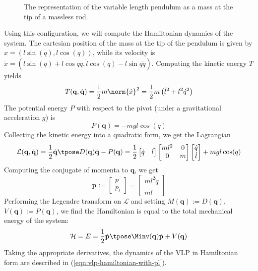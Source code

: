 \begin{figure}
   \centering
   
   \caption{The representation of the variable length pendulum as a mass at the
      tip of a massless rod.}\label{fig:vlp-model}
\end{figure}

Using this configuration, we will compute the Hamiltonian dynamics of the system.
The cartesian position of the mass at the tip of the pendulum
is given by \(x = (l\sin(q),l\cos(q))\), while its velocity is
\(\dot{x} = (\dot{l}\sin(q) + l\cos{q}\dot{q}, \dot{l}\cos(q) - l\sin{q}\dot{q})\).
Computing the kinetic energy \(T\) yields
\[
   T(\mathbf{q},\dot{\mathbf{q}}) = 
   \frac{1}{2}m\norm{\dot{x}}^2 = \frac{1}{2}m\left(\dot{l}^2 + l^2\dot{q}^2\right)
\]
The potential energy \(P\) with respect to the pivot (under a gravitational
acceleration \(g\)) is
\[
   P(\mathbf{q}) = -mgl\cos(q)
\]
Collecting the kinetic energy into a quadratic form, we get the Lagrangian
\[
   \mathcal{L}(\mathbf{q},\dot{\mathbf{q}}) 
   = \frac{1}{2} \dot{\mathbf{q}}\tpose D(\mathbf{q})\dot{\mathbf{q}} - P(\mathbf{q})
   = \frac{1}{2}
   \begin{bmatrix} \dot{q} & \dot{l} \end{bmatrix}
   \begin{bmatrix}
      ml^2 & 0 \\
      0 & m \\
   \end{bmatrix}
   \begin{bmatrix} 
      \dot{q} \\ \dot{l}
   \end{bmatrix}
   + mgl\cos(q)
\]
Computing the conjugate of momenta to \(\mathbf{q}\), we get 
\[
   \mathbf{p} := \begin{bmatrix} p \\ p_l \end{bmatrix} 
   = \begin{bmatrix} ml^2\dot{q} \\ m\dot{l} \end{bmatrix} 
\]
Performing the Legendre transform on \(\mathcal{L}\) and setting
\(M(\mathbf{q}) := D(\mathbf{q})\), \(V(\mathbf{q}) := P(\mathbf{q})\),
we find the Hamiltonian is equal to the total mechanical energy of the system:
\[
   \mathcal{H} = E = \frac{1}{2}\dot{\mathbf{p}}\tpose \Minv(\mathbf{q})
   \dot{\mathbf{p}}+V(\mathbf{q})
\]
Taking the appropriate derivatives, the dynamics of the VLP in Hamiltonian form
are described in (\ref{eqn:vlp-hamiltonian-with-pl}). 
